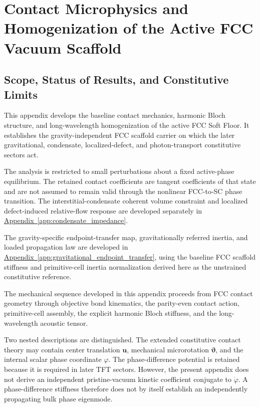 \chapter[FCC Contact Microphysics]{Contact Microphysics and Homogenization of the Active FCC Vacuum Scaffold}
\label{app:fcc_microphysics}

\section{Scope, Status of Results, and Constitutive Limits}
\label{sec:fcc_microphysics_scope}

This appendix develops the baseline contact mechanics, harmonic Bloch structure, and long-wavelength homogenization of the active FCC Soft Floor. It establishes the gravity-independent FCC scaffold carrier on which the later gravitational, condensate, localized-defect, and photon-transport constitutive sectors act.

The analysis is restricted to small perturbations about a fixed active-phase equilibrium. The retained contact coefficients are tangent coefficients of that state and are not assumed to remain valid through the nonlinear FCC-to-SC phase transition. The interstitial-condensate coherent volume constraint and localized defect-induced relative-flow response are developed separately in \hyperref[app:condensate_impedance]{Appendix~\ref*{app:condensate_impedance}}.

The gravity-specific endpoint-transfer map, gravitationally referred inertia, and loaded propagation law are developed in \hyperref[app:gravitational_endpoint_transfer]{Appendix~\ref*{app:gravitational_endpoint_transfer}}, using the baseline FCC scaffold stiffness and primitive-cell inertia normalization derived here as the unstrained constitutive reference.

The mechanical sequence developed in this appendix proceeds from FCC contact geometry through objective bond kinematics, the parity-even contact action, primitive-cell assembly, the explicit harmonic Bloch stiffness, and the long-wavelength acoustic tensor.

Two nested descriptions are distinguished. The extended constitutive contact theory may contain center translation $\mathbf{u}$, mechanical microrotation $\boldsymbol{\vartheta}$, and the internal scalar phase coordinate $\varphi$. The phase-difference potential is retained because it is required in later TFT sectors. However, the present appendix does not derive an independent pristine-vacuum kinetic coefficient conjugate to $\dot{\varphi}$. A phase-difference stiffness therefore does not by itself establish an independently propagating bulk phase eigenmode.

